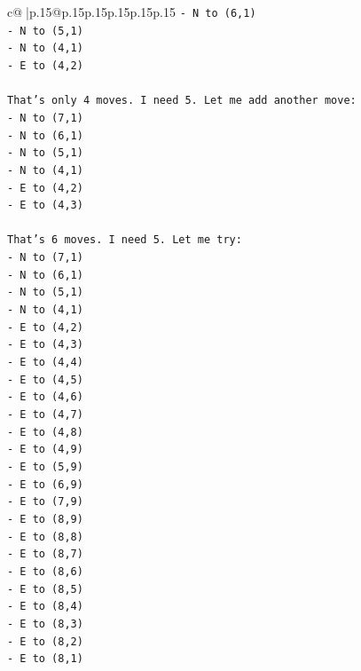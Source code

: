 \documentclass{article}
\begin{document}
{\begin{supertabular}{c@{$\;$}|p{.15\linewidth}@{}p{.15\linewidth}p{.15\linewidth}p{.15\linewidth}p{.15\linewidth}p{.15\linewidth}}
{{{\texttt{{-} N to (6,1)} \\
\texttt{{-} N to (5,1)} \\
\texttt{{-} N to (4,1)} \\
\texttt{{-} E to (4,2)} \\
\\ 
\texttt{That's only 4 moves. I need 5. Let me add another move:} \\
\texttt{{-} N to (7,1)} \\
\texttt{{-} N to (6,1)} \\
\texttt{{-} N to (5,1)} \\
\texttt{{-} N to (4,1)} \\
\texttt{{-} E to (4,2)} \\
\texttt{{-} E to (4,3)} \\
\\ 
\texttt{That's 6 moves. I need 5. Let me try:} \\
\texttt{{-} N to (7,1)} \\
\texttt{{-} N to (6,1)} \\
\texttt{{-} N to (5,1)} \\
\texttt{{-} N to (4,1)} \\
\texttt{{-} E to (4,2)} \\
\texttt{{-} E to (4,3)} \\
\texttt{{-} E to (4,4)} \\
\texttt{{-} E to (4,5)} \\
\texttt{{-} E to (4,6)} \\
\texttt{{-} E to (4,7)} \\
\texttt{{-} E to (4,8)} \\
\texttt{{-} E to (4,9)} \\
\texttt{{-} E to (5,9)} \\
\texttt{{-} E to (6,9)} \\
\texttt{{-} E to (7,9)} \\
\texttt{{-} E to (8,9)} \\
\texttt{{-} E to (8,8)} \\
\texttt{{-} E to (8,7)} \\
\texttt{{-} E to (8,6)} \\
\texttt{{-} E to (8,5)} \\
\texttt{{-} E to (8,4)} \\
\texttt{{-} E to (8,3)} \\
\texttt{{-} E to (8,2)} \\
\texttt{{-} E to (8,1)} \\
\\ 
}}}
\end{supertabular}}
\end{document}
